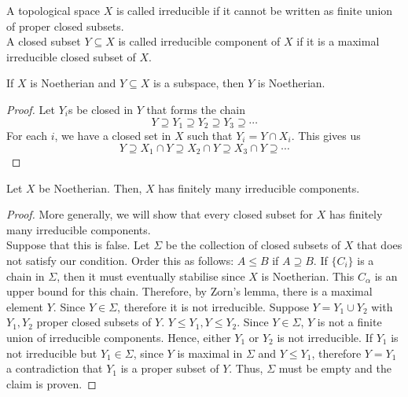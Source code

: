 \documentclass[oneside, 12pt, ]{scrbook}
\theoremstyle{theorem}
\begin{document}
\begin{definition}
A topological space $X$ is called irreducible if it cannot be written as finite union of proper closed subsets. \\

A closed subset $Y \subseteq X$ is called irreducible component of $X$ if it is a maximal irreducible closed subset of $X$.
\end{definition}

\begin{lemma}
If $X$ is Noetherian and $Y \subseteq X$ is a subspace, then $Y$ is Noetherian. 
\end{lemma}

\begin{proof}
Let $Y_{i}$s be closed in $Y$ that forms the chain $$Y \supseteq Y_{1} \supseteq Y_{2} \supseteq Y_{3} \supseteq \cdots $$ For each $i$, we have a closed set in $X$ such that $Y_{i} = Y \cap X_{i}$. This gives us $$Y \supseteq X_{1}\cap Y \supseteq X_{2}\cap Y \supseteq X_{3}\cap Y \supseteq \cdots $$
\end{proof}

\begin{lemma}
Let $X$ be Noetherian. Then, $X$ has finitely many irreducible components. 
\end{lemma}

\begin{proof}
More generally, we will show that every closed subset for $X$ has finitely many irreducible components. \\

Suppose that this is false. Let $\Sigma$ be the collection of closed subsets of $X$ that does not satisfy our condition. Order this as follows: $A \le B$ if $A \supseteq B$. If $\{C_{i}\}$ is a chain in $\Sigma$, then it must eventually stabilise since $X$ is Noetherian. This $C_{\alpha}$ is an upper bound for this chain. Therefore, by Zorn's lemma, there is a maximal element $Y$. Since $Y \in \Sigma$, therefore it is not irreducible. Suppose $Y = Y_{1} \cup Y_{2}$ with $Y_{1},Y_{2}$ proper closed subsets of $Y$. $Y \le Y_{1}, Y \le Y_{2}$. Since $Y \in \Sigma$, $Y$ is not a finite union of irreducible components. Hence, either $Y_{1}$ or $Y_{2}$ is not irreducible. If $Y_{1}$ is not irreducible but $Y_{1} \in \Sigma$, since $Y$ is maximal in $\Sigma$ and $Y \le Y_{1}$, therefore $Y =Y_{1}$ a contradiction that $Y_{1}$ is a proper subset of $Y$. Thus, $\Sigma$ must be empty and the claim is proven. 
\end{proof}
\end{document}
